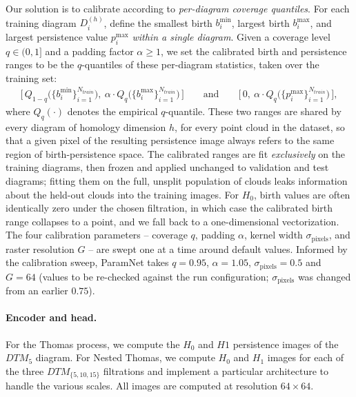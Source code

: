 \documentclass[11pt,a4paper]{article}
\theoremstyle{definitioncolon}
\begin{document}
Our solution is to calibrate according to \emph{per-diagram coverage quantiles}.
For each training diagram $D_i^{(h)}$, define the smallest birth
$b_i^{\min}$, largest birth $b_i^{\max}$, and largest persistence value
$p_i^{\max}$ \emph{within a single diagram}. Given a coverage level
$q \in (0,1]$ and a
padding factor $\alpha \geq 1$, we set the calibrated birth and persistence
ranges to be the $q$-quantiles of these per-diagram statistics, taken over the
training set:
\begin{align*}
    \big[\,Q_{1-q}\big(\{b_i^{\min}\}_{i=1}^{N_{train}}\big),\
    \alpha \cdot Q_{q}\big(\{b_i^{\max}\}_{i=1}^{N_{train}}\big)\,\big]
    \qquad \text{and} \qquad
    \big[\,0,\ \alpha \cdot
    Q_{q}\big(\{p_i^{\max}\}_{i=1}^{N_{train}}\big)\,\big],
\end{align*}
where $Q_q(\cdot)$ denotes the empirical $q$-quantile. These two
ranges are shared by every diagram of homology dimension $h$, for every point
cloud in the dataset, so that a
given pixel of the resulting persistence image always refers to the same region
of birth-persistence space.
The calibrated ranges are fit \emph{exclusively} on the training diagrams,
then frozen and applied unchanged to validation and test diagrams;
fitting them on the full, unsplit population of clouds leaks information
about the held-out clouds into the training images.
For $H_0$, birth values are often identically zero under the
chosen filtration, in which case the calibrated birth range
collapses to a point, and we fall back to a
one-dimensional vectorization.
The four calibration parameters -- coverage $q$, padding $\alpha$, kernel width
$\sigma_{\text{pixels}}$, and raster resolution $G$ -- are swept one at a time
around default values. Informed by the calibration sweep, ParamNet takes $q=0.95$, $\alpha=1.05$,
$\sigma_{\text{pixels}}=0.5$ and $G=64$ (values to be re-checked against the run
configuration; $\sigma_{\text{pixels}}$ was changed from an earlier $0.75$).

\paragraph{Encoder and head.} For the Thomas process, we compute the $H_0$ and $H1$ persistence images of the $DTM_5$ diagram. For Nested Thomas, we compute $H_0$ and $H_1$ images for each of the three $DTM_{\{5,10,15\}}$ filtrations and implement a particular architecture to handle the various scales. All images are computed at resolution $64 \times 64$.
\end{document}

